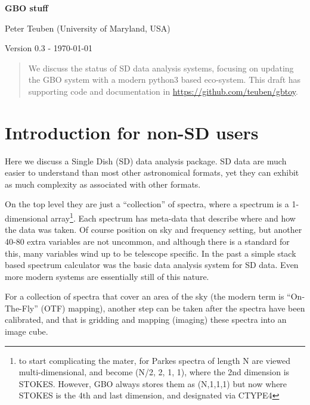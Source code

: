 \documentclass[12pt,a4paper]{article}
\begin{document}
\pagestyle{plain}
 

\begin{center}
{\Large{\bf{  GBO stuff  \\  }}} 

\end{center}
\bigskip

\centerline{Peter Teuben (University of Maryland, USA)}

\centerline{Version 0.3 - \today}
\bigskip

\begin{abstract}

We discuss the status of SD data analysis systems, focusing on
updating the GBO system with a modern python3 based eco-system. This
draft has supporting code and documentation in
\url{https://github.com/teuben/gbtoy}.

\end{abstract}

\section{Introduction for non-SD users}

Here we discuss a Single Dish (SD) data analysis package.  SD data are
much easier to understand than most other astronomical formats,
yet they can exhibit as much complexity as associated with other formats.

On the top level they are just a ``collection'' of spectra, where a
spectrum is a 1-dimensional array\footnote{to start complicating the
  mater, for Parkes spectra of length N are viewed multi-dimensional, and
  become (N/2, 2, 1, 1), where the 2nd dimension is STOKES.   However, GBO
  always stores them as (N,1,1,1) but now where STOKES is the 4th and last
  dimension, and designated via CTYPE4}. Each spectrum has meta-data that describe
where and how the data was taken. Of course position on sky and
frequency setting, but another 40-80 extra variables are not uncommon,
and although there is a standard for this, many variables wind up to be telescope
specific. In the past a simple stack based spectrum calculator was the
basic data analysis system for SD data.
Even more modern systems are essentially still of this nature.
 
For a collection of spectra that cover an area of the sky (the modern
term is ``On-The-Fly'' (OTF) mapping), another step can be taken after
the spectra have been calibrated, and that is gridding and mapping
(imaging) these spectra into an image cube.
\end{document}

